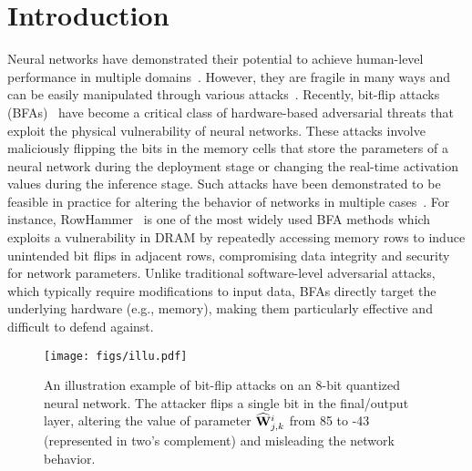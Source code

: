 \section{Introduction}\label{sec:intro}
Neural networks have demonstrated their potential to achieve human-level performance in multiple domains~\cite{dong2021survey,MusaHLLY23}. 
However, they are fragile in many ways and can be easily manipulated through various attacks~\cite{khalid2021exploiting,LiuWLX17,yao2020deephammer,HONG_USENIX19,CCFDZSL20,SongLCFL21,DZBS21,ChenZZS23,ZhaoCLLSWS24,ChenZS24}.
Recently, bit-flip attacks (BFAs)~\cite{BFAICCV19,liyes,1bitallyouneed,SURVEY} have become a critical class of hardware-based adversarial threats that exploit the physical vulnerability of neural networks. These attacks involve maliciously flipping the bits in the memory cells that store the parameters of a neural network during the deployment stage or changing the real-time activation values during the inference stage. Such attacks have been demonstrated to be feasible in practice for altering the behavior of networks in multiple cases~\cite{walker2021dram,PRACTICALATTACK,tol2022toward}. For instance, RowHammer~\cite{DONTKNOCK,ROWHAMMER} is one of the most widely used BFA methods which exploits a vulnerability in DRAM by repeatedly accessing memory rows to induce unintended bit flips in adjacent rows, compromising data integrity and security for network parameters. 
Unlike traditional software-level adversarial attacks, which typically require modifications to input data, BFAs directly target the underlying hardware (e.g., memory), making them particularly effective and difficult to defend against. 

\begin{figure}
    \centering
    \texttt{[image: figs/illu.pdf]}
    \caption{An illustration example of bit-flip attacks on an 8-bit quantized neural network. The attacker flips a single bit in the final/output layer, altering the value of parameter $\widehat{{\mathbf{W}}}^i_{j,k}$ from 85 to -43 (represented in two's complement) and misleading the network behavior.}
    \label{fig:illu}
\end{figure}

